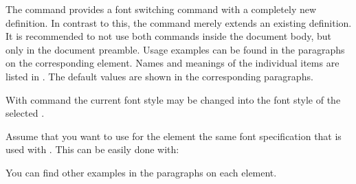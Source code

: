 The command  provides a font switching command with a
completely new definition. In contrast to this, the 
command merely extends an existing definition. It is recommended to not use
both commands inside the document body, but only in the document preamble.
Usage examples can be found in the paragraphs on the corresponding element.
\fi %
Names and meanings of the individual items are listed in %
%
%
.  %
%
The default values are shown in the corresponding paragraphs.

\ifIgnoreThis %
\else %
With command  the current font style may be changed into
the font style of the selected .
%
\ifCommonmaincls %
%
\begin{Example}
  \label{desc:maincls.setkomafont.example}%
  Assume that you want to use for the element  the
  same font specification that is used with
  . This can be easily done with:
\begin{lstcode}
\end{lstcode}
  You can find other examples in the paragraphs on each element.
\end{Example}

